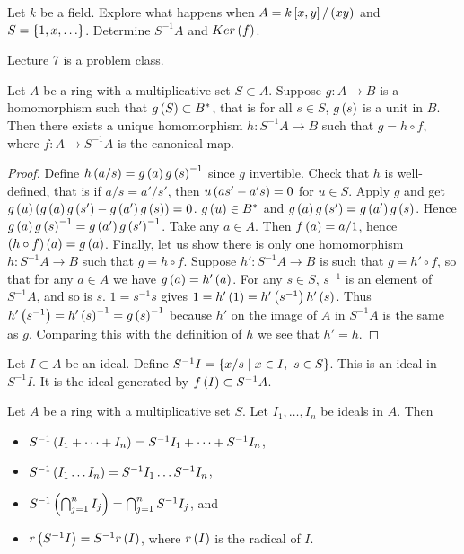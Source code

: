 \begin{example*}
Let $ k $ be a field. Explore what happens when $ A = k\left[ x, y \right] / \left( xy \right) $ and $ S = \cb{1, x, \dots} $. Determine $ S^{-1}A $ and $ Ker\left( f \right) $.
\end{example*}


Lecture 7 is a problem class.

\pagebreak


\begin{lemma}
Let $ A $ be a ring with a multiplicative set $ S \subset A $. Suppose $ g : A \to B $ is a homomorphism such that $ g\left( S \right) \subset B^* $, that is for all $ s \in S $, $ g\left( s \right) $ is a unit in $ B $. Then there exists a unique homomorphism $ h : S^{-1}A \to B $ such that $ g = h \circ f $, where $ f : A \to S^{-1}A $ is the canonical map.
\end{lemma}

\begin{proof}
Define $ h\left( a / s \right) = g\left( a \right)g\left( s \right)^{-1} $ since $ g $ invertible. Check that $ h $ is well-defined, that is if $ a / s = a' / s' $, then $ u\left( as' - a's \right) = 0 $ for $ u \in S $. Apply $ g $ and get $ g\left( u \right)\left( g\left( a \right)g\left( s' \right) - g\left( a' \right)g\left( s \right) \right) = 0 $. $ g\left( u \right) \in B^* $ and $ g\left( a \right)g\left( s' \right) = g\left( a' \right)g\left( s \right) $. Hence $ g\left( a \right)g\left( s \right)^{-1} = g\left( a' \right)g\left( s' \right)^{-1} $. Take any $ a \in A $. Then $ f\left( a \right) = a / 1 $, hence $ \left( h \circ f \right)\left( a \right) = g\left( a \right) $. Finally, let us show there is only one homomorphism $ h : S^{-1}A \to B $ such that $ g = h \circ f $. Suppose $ h' : S^{-1}A \to B $ is such that $ g = h' \circ f $, so that for any $ a \in A $ we have $ g\left( a \right) = h'\left( a \right) $. For any $ s \in S $, $ s^{-1} $ is an element of $ S^{-1}A $, and so is $ s $. $ 1 = s^{-1}s $ gives $ 1 = h'\left( 1 \right) = h'\left( s^{-1} \right)h'\left( s \right) $. Thus $ h'\left( s^{-1} \right) = h'\left( s \right)^{-1} = g\left( s \right)^{-1} $ because $ h' $ on the image of $ A $ in $ S^{-1}A $ is the same as $ g $. Comparing this with the definition of $ h $ we see that $ h' = h $.
\end{proof}

Let $ I \subset A $ be an ideal. Define $ S^{-1}I = \left\{ x / s \mid x \in I, \ s \in S \right\} $. This is an ideal in $ S^{-1}I $. It is the ideal generated by $ f\left( I \right) \subset S^{-1}A $.

\begin{proposition}
Let $ A $ be a ring with a multiplicative set $ S $. Let $ I_1, \dots, I_n $ be ideals in $ A $. Then
\begin{itemize}
\item $ S^{-1}\left( I_1 + \dots + I_n \right) = S^{-1}I_1 + \dots + S^{-1}I_n $,
\item $ S^{-1}\left( I_1 \dots I_n \right) = S^{-1}I_1 \dots S^{-1}I_n $,
\item $ S^{-1}\left( \bigcap_{j = 1}^n I_j \right) = \bigcap_{j = 1}^n S^{-1}I_j $, and
\item $ r\left( S^{-1}I \right) = S^{-1}r\left( I \right) $, where $ r\left( I \right) $ is the radical of $ I $.
\end{itemize}
\end{proposition}

